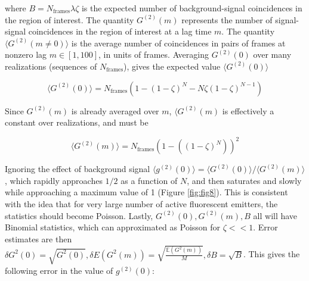

where $B = N_{\mathrm{frames}}\lambda\zeta$ is the expected number of background-signal coincidences in the region of interest. The quantity $G^{(2)}(m)$ represents the number of signal-signal coincidences in the region of interest at a lag time $m$. The quantity $\langle G^{(2)}(m\neq 0)\rangle$ is the average number of coincidences in pairs of frames at nonzero lag $m \in [1,100]$, in units of frames. Averaging $G^{(2)}(0)$ over many realizations (sequences of $N_{\mathrm{frames}}$), gives the expected value $\langle G^{(2)}(0)\rangle $

\begin{equation}
\langle G^{(2)}(0)\rangle = N_{\mathrm{frames}}(1 - (1-\zeta)^N - N\zeta (1-\zeta)^{N-1})
\end{equation}

Since $G^{(2)}(m)$ is already averaged over $m$, $\langle G^{(2)}(m) $ is effectively a constant over realizations, and must be

\begin{equation}
\langle G^{(2)}(m)\rangle =  N_{\mathrm{frames}} \left(1 - \left((1-\zeta)^N\right)\right)^2
\end{equation}

Ignoring the effect of background signal $\langle g^{(2)}(0)\rangle =\langle G^{(2)}(0)\rangle/\langle G^{(2)}(m)\rangle$, which rapidly approaches $1/2$ as a function of $N$, and then saturates and slowly while approaching a maximum value of 1 (Figure \ref{fig:fig8}). This is consistent with the idea that for very large number of active fluorescent emitters, the statistics should become Poisson. Lastly, $G^{(2)}(0),G^{(2)}(m),B$ all will have Binomial statistics, which can approximated as Poisson for $\zeta << 1$. Error estimates are then $\delta G^2(0) = \sqrt{G^2(0)}, \delta E(G^2(m)) = \sqrt{\frac{\mathbb{E}(G^2(m))}{M}}, \delta B = \sqrt{B}$. This gives the following error in the value of $g^{(2)}(0)$:

